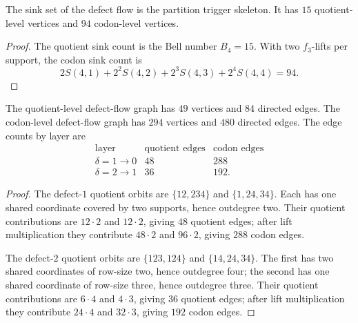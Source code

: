 \begin{corollary}
\label{cor:philosophy-defect-flow-partition-sinks}
The sink set of the defect flow is the partition trigger skeleton. It
has $15$ quotient-level vertices and $94$ codon-level vertices.
\end{corollary}
\begin{proof}
The quotient sink count is the Bell number $B_{4}=15$. With two
$f_{3}$-lifts per support, the codon sink count is
$$
  2S(4,1)+2^{2}S(4,2)+2^{3}S(4,3)+2^{4}S(4,4)
  =
  94.
$$
\end{proof}

\begin{theorem}
\label{thm:philosophy-defect-flow-edge-counts}
The quotient-level defect-flow graph has $49$ vertices and $84$
directed edges. The codon-level defect-flow graph has $294$ vertices and
$480$ directed edges. The edge counts by layer are
$$
\begin{array}{c|r|r}
  \text{layer} & \text{quotient edges} & \text{codon edges}\\
  \hline
  \delta=1\to0 & 48 & 288\\
  \delta=2\to1 & 36 & 192.
\end{array}
$$
\end{theorem}
\begin{proof}
The defect-$1$ quotient orbits are $\{12,234\}$ and $\{1,24,34\}$.
Each has one shared coordinate covered by two supports, hence outdegree
two. Their quotient contributions are $12\cdot2$ and $12\cdot2$,
giving $48$ quotient edges; after lift multiplication they contribute
$48\cdot2$ and $96\cdot2$, giving $288$ codon edges.

The defect-$2$ quotient orbits are $\{123,124\}$ and $\{14,24,34\}$.
The first has two shared coordinates of row-size two, hence outdegree
four; the second has one shared coordinate of row-size three, hence
outdegree three. Their quotient contributions are $6\cdot4$ and
$4\cdot3$, giving $36$ quotient edges; after lift multiplication they
contribute $24\cdot4$ and $32\cdot3$, giving $192$ codon edges.
\end{proof}

